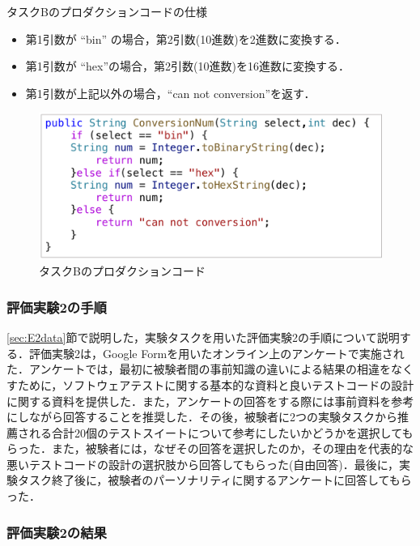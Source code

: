 \documentclass[12pt]{jarticle} %
\begin{document}
\begin{description}
\begin{itembox}[l]{タスクBのプロダクションコードの仕様}
\begin{itemize}
\item 第1引数が ``bin'' の場合，第2引数(10進数)を2進数に変換する．
\item 第1引数が ``hex''の場合，第2引数(10進数)を16進数に変換する．
\item 第1引数が上記以外の場合，``can not conversion''を返す．
\end{itemize}
\end{itembox}

\begin{figure}[htbp]
\begin{center}
\includegraphics[clip,width=12cm]{taskB.pdf}
\caption{タスクBのプロダクションコード}
\label{TaskB}
\end{center}
\end{figure}

\end{description}

\subsubsection{評価実験2の手順}

\ref{sec:E2data}節で説明した，実験タスクを用いた評価実験2の手順について説明する．評価実験2は，Google Formを用いたオンライン上のアンケートで実施された．アンケートでは，最初に被験者間の事前知識の違いによる結果の相違をなくすために，ソフトウェアテストに関する基本的な資料と良いテストコードの設計に関する資料を提供した．また，アンケートの回答をする際には事前資料を参考にしながら回答することを推奨した．その後，被験者に2つの実験タスクから推薦される合計20個のテストスイートについて参考にしたいかどうかを選択してもらった．また，被験者には，なぜその回答を選択したのか，その理由を代表的な悪いテストコードの設計の選択肢から回答してもらった(自由回答)．最後に，実験タスク終了後に，被験者のパーソナリティに関するアンケートに回答してもらった．

\subsubsection{評価実験2の結果}
\end{document}
